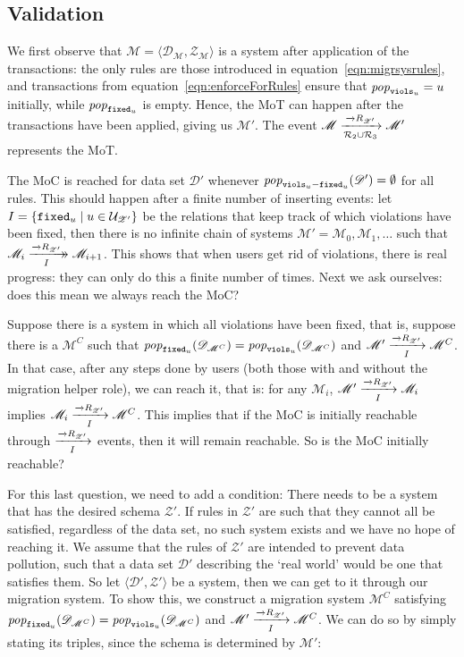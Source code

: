 \documentclass[runningheads]{llncs}
\newcommand{\xrightarrowdbl}[2][]{%
  \xrightarrow[#1]{#2}\mathrel{\mkern-14mu}\rightarrow
}
\newcommand{\id}[1]{\text{\it #1\/}}
\newcommand{\popF}[1]{\id{pop}_{#1}}
\newcommand{\pop}[2]{\popF{#1}(#2)}
\newcommand{\pair}[2]{\langle{#1},{#2}\rangle}
\newcommand{\rels}{\mathcal{R}}   %
\newcommand{\rules}{\mathcal{U}}
\newcommand{\dataset}{\mathscr{D}}
\newcommand{\schema}{\mathscr{Z}}
\newcommand{\migrsys}{\mathscr{M}}
\begin{document}
\subsection{Validation}
   We first observe that $\migrsys = \pair{\dataset_\migrsys}{\schema_\migrsys}$ is a system after application of the transactions:
   the only rules are those introduced in equation~\ref{eqn:migrsysrules}, and transactions from equation~\ref{eqn:enforceForRules} ensure that $\popF{{\tt viols}_u} = u$ initially, while $\popF{{\tt fixed}_u}$ is empty.
   Hence, the MoT can happen after the transactions have been applied, giving us $\migrsys'$.
   The event $\migrsys \xrightarrow[\rels_2 \cup \rels_3]{\overrightarrow\rels_{\schema'}}\migrsys'$ represents the MoT.
   
   The MoC is reached for data set $\dataset'$ whenever $\pop{{\tt viols}_u - {\tt fixed}_u}{\dataset'}=\emptyset$ for all rules.
   This should happen after a finite number of inserting events: let $I = \{{\tt fixed}_u \mid u\in\rules_{\schema'}\}$ be the relations that keep track of which violations have been fixed, then there is no infinite chain of systems $\migrsys' = \migrsys_0, \migrsys_1,\ldots$ such that $\migrsys_i\xrightarrowdbl[I]{\overrightarrow\rels_{\schema'}}\migrsys_{i+1}$.
   This shows that when users get rid of violations, there is real progress: they can only do this a finite number of times.
   Next we ask ourselves: does this mean we always reach the MoC?
   
   Suppose there is a system in which all violations have been fixed, that is, suppose there is a $\migrsys^C$ such that $\pop{{\tt fixed}_u}{\dataset_{\migrsys^C}}=\pop{{\tt viols}_u}{\dataset_{\migrsys^C}}$ and $\migrsys'\xrightarrow[I]{\overrightarrow\rels_{\schema'}} \migrsys^C$.
   In that case, after any steps done by users (both those with and without the migration helper role), we can reach it, that is: for any $\migrsys_i$, $\migrsys'\xrightarrow[I]{\overrightarrow\rels_{\schema'}} \migrsys_i$ implies $\migrsys_i\xrightarrow[I]{\overrightarrow\rels_{\schema'}} \migrsys^C$.
   This implies that if the MoC is initially reachable through $\xrightarrow[I]{\overrightarrow\rels_{\schema'}}$ events, then it will remain reachable.
   So is the MoC initially reachable?
   
   For this last question, we need to add a condition:
   There needs to be a system that has the desired schema $\schema'$.
   If rules in $\schema'$ are such that they cannot all be satisfied, regardless of the data set, no such system exists and we have no hope of reaching it.
   We assume that the rules of $\schema'$ are intended to prevent data pollution, such that a data set $\dataset'$ describing the `real world' would be one that satisfies them.
   So let $\pair{\dataset'}{\schema'}$ be a system, then we can get to it through our migration system.
   To show this, we construct a migration system $\migrsys^C$ satisfying $\pop{{\tt fixed}_u}{\dataset_{\migrsys^C}}=\pop{{\tt viols}_u}{\dataset_{\migrsys^C}}$ and $\migrsys'\xrightarrow[I]{\overrightarrow\rels_{\schema'}} \migrsys^C$.
   We can do so by simply stating its triples, since the schema is determined by $\migrsys'$:
   
\end{document}

